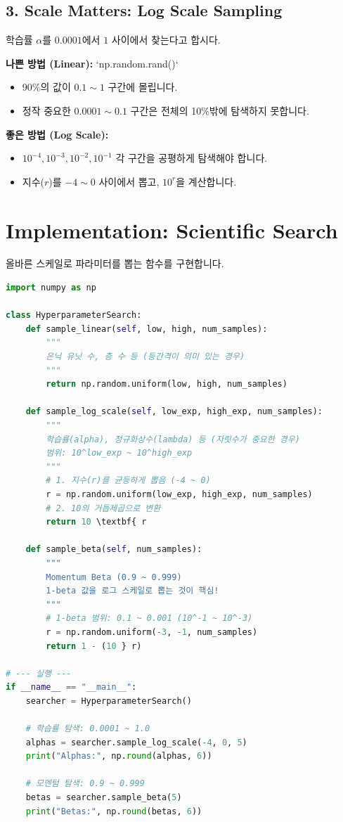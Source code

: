 \documentclass[11pt,a4paper]{book}
\theoremstyle{definition}
\begin{document}
\subsection{3. Scale Matters: Log Scale Sampling}
학습률 $\alpha$를 $0.0001$에서 $1$ 사이에서 찾는다고 합시다.

\textbf{나쁜 방법 (Linear):} `np.random.rand()`
\begin{itemize}
    \item 90\%의 값이 $0.1 \sim 1$ 구간에 몰립니다.
    \item 정작 중요한 $0.0001 \sim 0.1$ 구간은 전체의 10\%밖에 탐색하지 못합니다.
\end{itemize}

\textbf{좋은 방법 (Log Scale):}
\begin{itemize}
    \item $10^{-4}, 10^{-3}, 10^{-2}, 10^{-1}$ 각 구간을 공평하게 탐색해야 합니다.
    \item 지수($r$)를 $-4 \sim 0$ 사이에서 뽑고, $10^r$을 계산합니다.
\end{itemize}

\section{Implementation: Scientific Search}

올바른 스케일로 파라미터를 뽑는 함수를 구현합니다.

\begin{lstlisting}[language=Python, caption=Hyperparameter Sampling Strategies, breaklines=true]
import numpy as np

class HyperparameterSearch:
    def sample_linear(self, low, high, num_samples):
        """
        은닉 유닛 수, 층 수 등 (등간격이 의미 있는 경우)
        """
        return np.random.uniform(low, high, num_samples)

    def sample_log_scale(self, low_exp, high_exp, num_samples):
        """
        학습률(alpha), 정규화상수(lambda) 등 (자릿수가 중요한 경우)
        범위: 10^low_exp ~ 10^high_exp
        """
        # 1. 지수(r)를 균등하게 뽑음 (-4 ~ 0)
        r = np.random.uniform(low_exp, high_exp, num_samples)
        # 2. 10의 거듭제곱으로 변환
        return 10 \textbf{ r

    def sample_beta(self, num_samples):
        """
        Momentum Beta (0.9 ~ 0.999)
        1-beta 값을 로그 스케일로 뽑는 것이 핵심!
        """
        # 1-beta 범위: 0.1 ~ 0.001 (10^-1 ~ 10^-3)
        r = np.random.uniform(-3, -1, num_samples)
        return 1 - (10 } r)

# --- 실행 ---
if __name__ == "__main__":
    searcher = HyperparameterSearch()
    
    # 학습률 탐색: 0.0001 ~ 1.0
    alphas = searcher.sample_log_scale(-4, 0, 5)
    print("Alphas:", np.round(alphas, 6))
    
    # 모멘텀 탐색: 0.9 ~ 0.999
    betas = searcher.sample_beta(5)
    print("Betas:", np.round(betas, 6))
\end{lstlisting}
\end{document}
